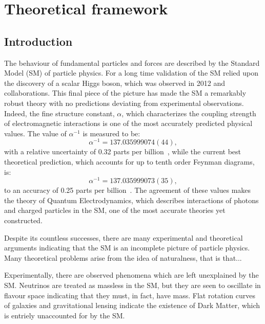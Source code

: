 \chapter{Theoretical framework}
\label{ch:theory}

\section{Introduction}
The behaviour of fundamental particles and forces are described by the Standard Model (SM) of
particle physics.
For a long time validation of the SM relied upon the discovery of a scalar Higgs boson, which was
observed in 2012 \cms and \atlas collaborations.
This final piece of the picture has made the SM a remarkably robust theory with no predictions
deviating from experimental observations.
Indeed, the fine structure constant, $\alpha$, which characterizes the coupling strength of
electromagnetic interactions is one of the most accurately predicted physical values.
The value of $\alpha^{-1}$ is measured to be:
\begin{equation}
  \alpha^{-1} = 137.035 999 074 (44),
\end{equation}
with a relative uncertainty of 0.32 parts per billion~\cite{PDG2012}, while the current best theoretical
prediction, which accounts for up to tenth order Feynman diagrams, is:
\begin{equation}
  \alpha^{-1} = 137.035 999 073 (35),
\end{equation}
to an accuracy of 0.25 parts per billion~\cite{Aoyama:2012wj}.
The agreement of these values makes the theory of Quantum Electrodynamics, which describes
interactions of photons and charged particles in the SM, one of the most accurate theories yet
constructed.

Despite its countless successes,
there are many experimental and theoretical arguments indicating that the SM is an incomplete
picture of particle physics.
Many theoretical problems arise from the idea of naturalness, that is that...

Experimentally, there are observed phenomena which are left unexplained by the SM.
Neutrinos are treated as massless in the SM, but they are seen to oscillate in flavour space
indicating that they must, in fact, have mass.
Flat rotation curves of galaxies and gravitational lensing indicate the existence of Dark Matter,
which is entriely unaccounted for by the SM.

